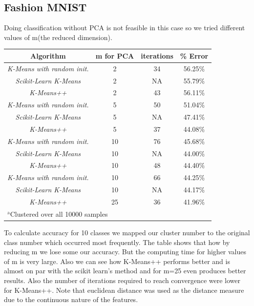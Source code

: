\documentclass[conference]{IEEEtran}
\begin{document}
    \subsection{Fashion MNIST}
    Doing classification without PCA is not feasible in this case so we tried different values of m(the reduced dimension).
    \begin{table}[htbp]
    \begin{center}
    \begin{tabular}{|c|c|c|c|}
    \hline
    \textbf{Algorithm}&\textbf{m for PCA}&\textbf{iterations}&\textbf{\% Error} \\
    \hline
    \textit{K-Means with random init.} &2&34&56.25\%\\
    \hline
    \textit{Scikit-Learn K-Means}&2&NA&55.79\%\\
    \hline
    \textit{K-Means++}&2&43&56.11\%\\
    \hline
    \textit{K-Means with random init.} &5&50&51.04\%\\
    \hline
    \textit{Scikit-Learn K-Means}&5&NA&47.41\%\\
    \hline
    \textit{K-Means++}&5&37&44.08\%\\
    \hline
    \textit{K-Means with random init.} &10&76&45.68\%\\
    \hline
    \textit{Scikit-Learn K-Means}&10&NA&44.00\%\\
    \hline
    \textit{K-Means++}&10&48&44.40\%\\
    \hline
    \textit{K-Means with random init.} &10&66&44.25\%\\
    \hline
    \textit{Scikit-Learn K-Means}&10&NA&44.17\%\\
    \hline
    \textit{K-Means++}&25&36&41.96\%\\
    \hline
    \multicolumn{4}{l}{$^{\mathrm{a}}$Clustered over all 10000 samples}
    \end{tabular}
    \label{tab1}
    \end{center}
    \end{table}
    \newline
    To calculate accuracy for 10 classes we mapped our cluster number to the original class number which occurred most frequently.\newline
    The table shows that how by reducing m we lose some our accuracy. But the computing time for higher values of m is very large. Also we can see how K-Means++ performs better and is almost on par with the scikit learn's method and for m=25 even produces better results. Also the number of iterations required to reach convergence were lower for K-Means++. Note that euclidean distance was used as the distance measure due to the continuous nature of the features.
\end{document}
